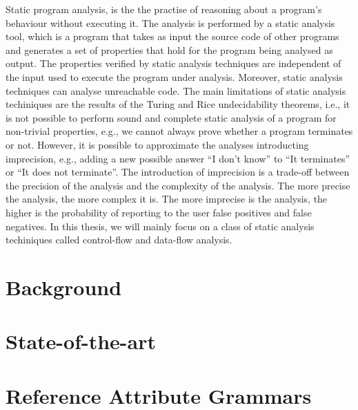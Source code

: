 Static program analysis, is the the practise of reasoning about a program's behaviour without executing it.
The analysis is performed by a static analysis tool,
which is a program that takes as input the source code of other programs and
generates a set of properties that hold for the program being analysed as output.
The properties verified by static analysis techniques are independent of the input
used to execute the program under analysis. Moreover, static analysis techniques can analyse unreachable code.
The main limitations of static analysis techiniques are the results of the Turing and Rice undecidability
theorems, i.e., it is not possible to perform sound and complete static analysis of a program for non-trivial properties, e.g., 
we cannot always prove whether a program terminates or not. However, it is possible
to approximate the analyses introducting imprecision, e.g., adding a new possible answer
``I don't know'' to  ``It terminates'' or ``It does not terminate''. The introduction 
of imprecision is a trade-off between the precision of the analysis and the complexity
of the analysis. The more precise the analysis, the more complex it is. 
The more imprecise is the analysis, the higher is the probability of reporting 
to the user false positives and false negatives. In this thesis, we will mainly focus on
a class of static analysis techiniques called control-flow and data-flow analysis. 













\section{Background}


\section{State-of-the-art}


\section{Reference Attribute Grammars}



